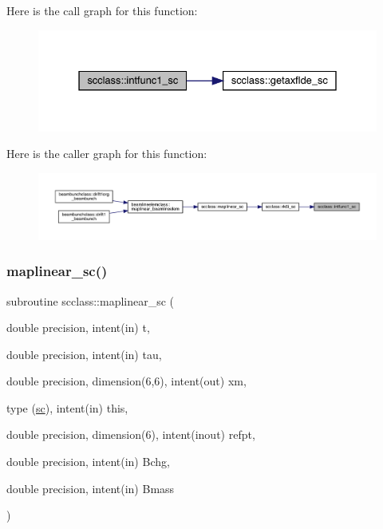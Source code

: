 Here is the call graph for this function\+:\nopagebreak
\begin{figure}[H]
\begin{center}
\leavevmode
\includegraphics[width=331pt]{namespacescclass_a5d354b33de72df0b6be68290744f94ba_cgraph}
\end{center}
\end{figure}
Here is the caller graph for this function\+:\nopagebreak
\begin{figure}[H]
\begin{center}
\leavevmode
\includegraphics[width=350pt]{namespacescclass_a5d354b33de72df0b6be68290744f94ba_icgraph}
\end{center}
\end{figure}
\mbox{\label{namespacescclass_aec786348c1a0beec0d090c12b13d588c}} 
\subsubsection{\texorpdfstring{maplinear\_sc()}{maplinear\_sc()}}
{\footnotesize\ttfamily subroutine scclass\+::maplinear\+\_\+sc (\begin{DoxyParamCaption}\item[{double precision, intent(in)}]{t,  }\item[{double precision, intent(in)}]{tau,  }\item[{double precision, dimension(6,6), intent(out)}]{xm,  }\item[{type (\mbox{\hyperlink{namespacescclass_structscclass_1_1sc}{sc}}), intent(in)}]{this,  }\item[{double precision, dimension(6), intent(inout)}]{refpt,  }\item[{double precision, intent(in)}]{Bchg,  }\item[{double precision, intent(in)}]{Bmass }\end{DoxyParamCaption})}

